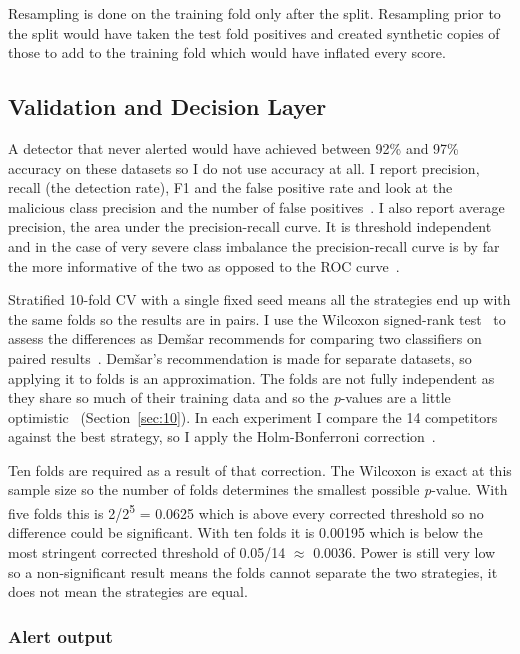 \documentclass[a4paper,12pt]{article}
\begin{document}
Resampling is done on the training fold only after the split. Resampling prior to the split would have taken the test fold positives and created synthetic copies of those to add to the training fold which would have inflated every score.

\subsection{Validation and Decision Layer}
\label{sec:6.7}

A detector that never alerted would have achieved between 92\% and 97\% accuracy on these datasets so I do not use accuracy at all. I report precision, recall (the detection rate), F1 and the false positive rate and look at the malicious class precision and the number of false positives~\cite{yuan2021}. I also report average precision, the area under the precision-recall curve. It is threshold independent and in the case of very severe class imbalance the precision-recall curve is by far the more informative of the two as opposed to the ROC curve~\cite{saito2015}.

Stratified 10-fold CV with a single fixed seed means all the strategies end up with the same folds so the results are in pairs. I use the Wilcoxon signed-rank test~\cite{wilcoxon1945} to assess the differences as Dem\v{s}ar recommends for comparing two classifiers on paired results~\cite{demsar2006}. Dem\v{s}ar’s recommendation is made for separate datasets, so applying it to folds is an approximation. The folds are not fully independent as they share so much of their training data and so the \emph{p}-values are a little optimistic~\cite{nadeau2003} (Section~\ref{sec:10}). In each experiment I compare the 14 competitors against the best strategy, so I apply the Holm-Bonferroni correction~\cite{holm1979}.

Ten folds are required as a result of that correction. The Wilcoxon is exact at this sample size so the number of folds determines the smallest possible \emph{p}-value. With five folds this is 2/2\textsuperscript{5} = 0.0625 which is above every corrected threshold so no difference could be significant. With ten folds it is 0.00195 which is below the most stringent corrected threshold of 0.05/14 $\approx$ 0.0036. Power is still very low so a non-significant result means the folds cannot separate the two strategies, it does not mean the strategies are equal.

\subsubsection*{Alert output}
\end{document}
